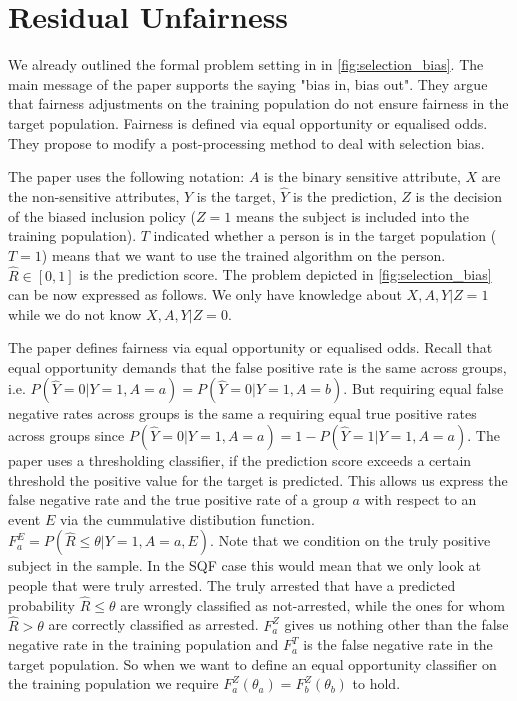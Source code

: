 \section{Residual Unfairness}
We already outlined the formal problem setting in \cite{kallus} in \autoref{fig:selection_bias}. The main message of the paper supports the saying "bias in, bias out". They argue that fairness adjustments on the training population do not ensure fairness in the target population. Fairness is defined via equal opportunity or equalised odds. They propose to modify a post-processing method to deal with selection bias.

The paper uses the following notation: $A$ is the binary sensitive attribute, $X$ are the non-sensitive attributes, $Y$ is the target, $\hat{Y}$ is the prediction, $Z$ is the decision of the biased inclusion policy ($Z= 1$ means the subject is included into the training population). $T$ indicated whether a person is in the target population ($T = 1$) means that we want to use the trained algorithm on the person. $\hat{R} \in [0,1]$ is the prediction score.
The problem depicted in \autoref{fig:selection_bias} can be now expressed as follows. We only have knowledge about $X, A, Y | Z = 1$ while we do not know $X, A, Y | Z = 0$. 

The paper defines fairness via equal opportunity or equalised odds. Recall that equal opportunity demands that the false positive rate is the same across groups, i.e. $P(\hat{Y} = 0 | Y = 1, A = a) = P(\hat{Y} = 0 | Y = 1, A = b)$. But requiring equal false negative rates across groups is the same a requiring equal true positive rates across groups since $P(\hat{Y} = 0 | Y = 1, A = a) = 1 - P(\hat{Y} = 1 | Y = 1, A = a)$.
The paper uses a thresholding classifier, if the prediction score exceeds a certain threshold the positive value for the target is predicted. This allows us express the false negative rate and the true positive rate of a group $a$ with respect to an event $E$ via the cummulative distibution function. $F_a^E = P(\hat{R} \leq \theta | Y = 1, A = a, E)$. Note that we condition on the truly positive subject in the sample. In the SQF case this would mean that we only look at people that were truly arrested.
The truly arrested that have a predicted probability $\hat{R} \leq \theta$ are wrongly classified as not-arrested, while the ones for whom $\hat{R} > \theta$ are correctly classified as arrested. $F_a^Z$ gives us nothing other than the false negative rate in the training population and $F_a^T$ is the false negative rate in the target population.
So when we want to define an equal opportunity classifier on the training population we require $F_a^Z(\theta_a) = F_b^Z(\theta_b)$ to hold. 

